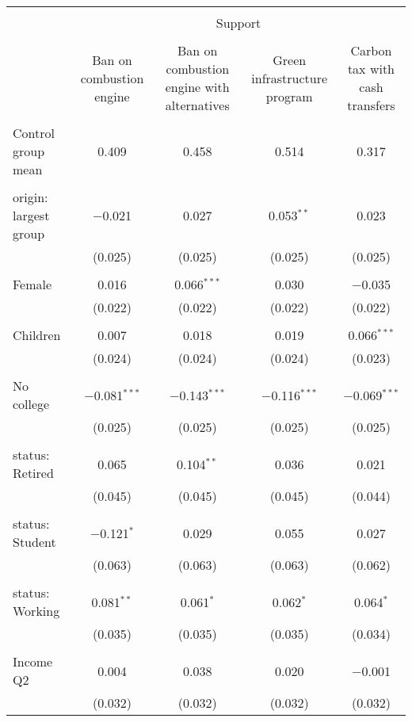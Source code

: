 
\begin{tabular}{@{\extracolsep{5pt}}lcccc} 
\\[-1.8ex]\hline 
\hline \\[-1.8ex] 
 & \multicolumn{4}{c}{Support} \\ 
\cline{2-5} 
\\[-1.8ex] & Ban on combustion engine & Ban on combustion engine with alternatives & Green infrastructure program & Carbon tax with cash transfers \\ 
\hline \\[-1.8ex] 
 Control group mean & 0.409 & 0.458 & 0.514 & 0.317  \\ \hline \\[-1.8ex] origin: largest group & $-$0.021 & 0.027 & 0.053$^{**}$ & 0.023 \\ 
  & (0.025) & (0.025) & (0.025) & (0.025) \\ 
  & & & & \\ 
 Female & 0.016 & 0.066$^{***}$ & 0.030 & $-$0.035 \\ 
  & (0.022) & (0.022) & (0.022) & (0.022) \\ 
  & & & & \\ 
 Children & 0.007 & 0.018 & 0.019 & 0.066$^{***}$ \\ 
  & (0.024) & (0.024) & (0.024) & (0.023) \\ 
  & & & & \\ 
 No college & $-$0.081$^{***}$ & $-$0.143$^{***}$ & $-$0.116$^{***}$ & $-$0.069$^{***}$ \\ 
  & (0.025) & (0.025) & (0.025) & (0.025) \\ 
  & & & & \\ 
 status: Retired & 0.065 & 0.104$^{**}$ & 0.036 & 0.021 \\ 
  & (0.045) & (0.045) & (0.045) & (0.044) \\ 
  & & & & \\ 
 status: Student & $-$0.121$^{*}$ & 0.029 & 0.055 & 0.027 \\ 
  & (0.063) & (0.063) & (0.063) & (0.062) \\ 
  & & & & \\ 
 status: Working & 0.081$^{**}$ & 0.061$^{*}$ & 0.062$^{*}$ & 0.064$^{*}$ \\ 
  & (0.035) & (0.035) & (0.035) & (0.034) \\ 
  & & & & \\ 
 Income Q2 & 0.004 & 0.038 & 0.020 & $-$0.001 \\ 
  & (0.032) & (0.032) & (0.032) & (0.032) \\ 

\end{tabular}

